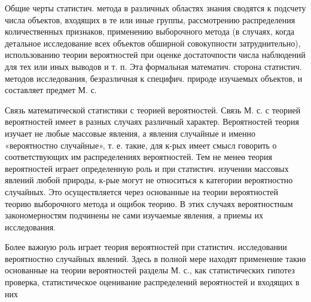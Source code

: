 \documentclass[10pt]{article}
\begin{document}
Общие черты статистич. метода в различных областях знания сводятся к подсчету числа объектов, входящих в те или иные группы, рассмотрению распределения количественных признаков, применению выборочного метода (в случаях, когда детальное исследование всех объектов обширной совокупности затруднительно), использованию теории вероятностей при оценке достаточпости числа наблюдений для тех или иных выводов и т. п. Эта формальная математич. сторона статистич. методов исследования, безразличная к специфич. природе изучаемых объектов, и составляет предмет М. с.



Связь математической статистики с теорией вероятностей. Связь М. с. с теорией вероятностей имеет в разных случаях различный характер. Вероятностей теория изучает не любые массовые явления, а явления случайные и именно «вероятностно случайные», т. е. такие, для к-рых имеет смысл говорить о соответствующих им распределениях вероятностей. Тем не менеө теория вероятностей играет определенную роль и при статистич. изучении массовых явлений любой природы, к-рые могут не относиться к категории вероятностно случайных. Это осуществляется через основанные на теории вероятностей теорию выборочного метода и ощибок теорию. В этих случаях вероятностным закономерностям подчинены не сами изучаемые явления, а приемы их исследования.



Более важную роль играет теория вероятностей при статистич. исследовании вероятностно случайных явлений. Здесь в полной мере находят применение такиө основанные на теории вероятностей разделы М. с., как статистических гипотез проверка, статистическое оценивание распределений вероятностей и входящих в них
\end{document}
